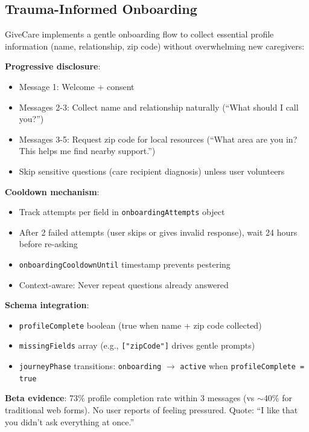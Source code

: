 \documentclass{article}%
\begin{document}
\subsection{Trauma{-}Informed Onboarding}%
\label{subsec:Trauma{-}InformedOnboarding}%
GiveCare implements a gentle onboarding flow to collect essential profile information (name, relationship, zip code) without overwhelming new caregivers:

\textbf{Progressive disclosure}:
\begin{itemize}
    \item Message 1: Welcome + consent
    \item Messages 2-3: Collect name and relationship naturally (``What should I call you?'')
    \item Messages 3-5: Request zip code for local resources (``What area are you in? This helps me find nearby support.'')
    \item Skip sensitive questions (care recipient diagnosis) unless user volunteers
\end{itemize}

\textbf{Cooldown mechanism}:
\begin{itemize}
    \item Track attempts per field in \texttt{onboardingAttempts} object
    \item After 2 failed attempts (user skips or gives invalid response), wait 24 hours before re-asking
    \item \texttt{onboardingCooldownUntil} timestamp prevents pestering
    \item Context-aware: Never repeat questions already answered
\end{itemize}

\textbf{Schema integration}:
\begin{itemize}
    \item \texttt{profileComplete} boolean (true when name + zip code collected)
    \item \texttt{missingFields} array (e.g., \texttt{["zipCode"]} drives gentle prompts)
    \item \texttt{journeyPhase} transitions: \texttt{onboarding} $\rightarrow$ \texttt{active} when \texttt{profileComplete = true}
\end{itemize}

\textbf{Beta evidence}: 73\% profile completion rate within 3 messages (vs $\sim$40\% for traditional web forms). No user reports of feeling pressured. Quote: ``I like that you didn't ask everything at once.''
\end{document}
